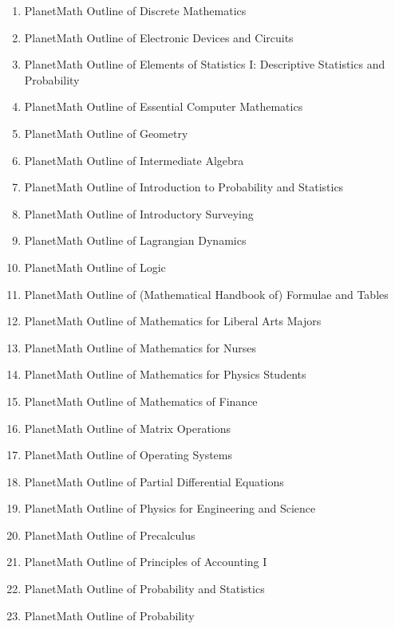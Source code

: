 \documentclass[12pt]{article}
\begin{document}
\begin{enumerate}
\item PlanetMath Outline of Discrete Mathematics
\item PlanetMath Outline of Electronic Devices and Circuits
\item PlanetMath Outline of Elements of Statistics I: Descriptive Statistics and Probability
\item PlanetMath Outline of Essential Computer Mathematics
\item PlanetMath Outline of Geometry
\item PlanetMath Outline of Intermediate Algebra
\item PlanetMath Outline of Introduction to Probability and Statistics
\item PlanetMath Outline of Introductory Surveying
\item PlanetMath Outline of Lagrangian Dynamics
\item PlanetMath Outline of Logic
\item PlanetMath Outline of (Mathematical Handbook of) Formulae and Tables
\item PlanetMath Outline of Mathematics for Liberal Arts Majors
\item PlanetMath Outline of Mathematics for Nurses
\item PlanetMath Outline of Mathematics for Physics Students
\item PlanetMath Outline of Mathematics of Finance
\item PlanetMath Outline of Matrix Operations
\item PlanetMath Outline of Operating Systems
\item PlanetMath Outline of Partial Differential Equations
\item PlanetMath Outline of Physics for Engineering and Science
\item PlanetMath Outline of Precalculus
\item PlanetMath Outline of Principles of Accounting I
\item PlanetMath Outline of Probability and Statistics
\item PlanetMath Outline of Probability

\end{enumerate}
\end{document}
